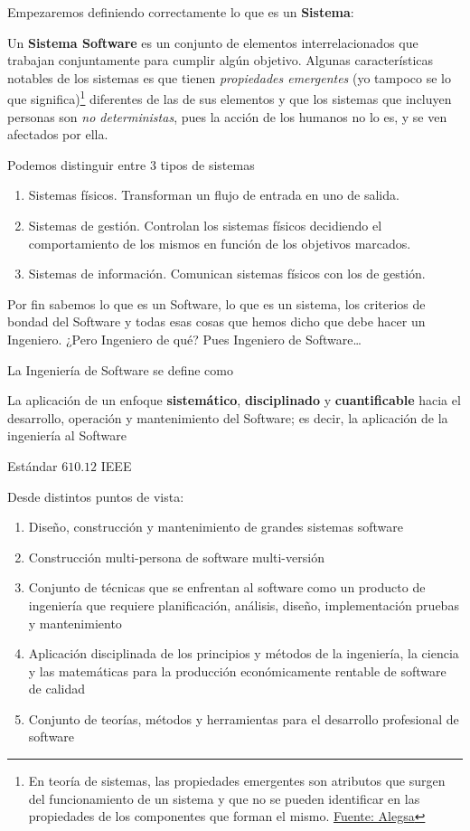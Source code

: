 \noindent Empezaremos definiendo correctamente lo que es un \textbf{Sistema}:

Un \textbf{Sistema Software} es un conjunto de elementos interrelacionados que trabajan conjuntamente para
cumplir algún objetivo. Algunas características notables de los sistemas es que tienen \textit{propiedades
emergentes} (yo tampoco se lo que significa)\footnote{En teoría de sistemas, las propiedades emergentes son 
atributos que surgen del funcionamiento de un sistema y que no se pueden identificar en las propiedades de los
componentes que forman el mismo. \href{https://www.alegsa.com.ar/Dic/propiedad_emergente.php}{Fuente: Alegsa}}
diferentes de las de sus elementos y que los sistemas que incluyen personas son \textit{no deterministas}, pues
la acción de los humanos no lo es, y se ven afectados por ella.

Podemos distinguir entre 3 tipos de sistemas

\begin{enumerate}
    \item Sistemas físicos. Transforman un flujo de entrada en uno de salida.
    \item Sistemas de gestión. Controlan los sistemas físicos decidiendo el comportamiento de los mismos en función
    de los objetivos marcados.
    \item Sistemas de información. Comunican sistemas físicos con los de gestión.
\end{enumerate}

Por fin sabemos lo que es un Software, lo que es un sistema, los criterios de bondad del Software y todas esas
cosas que hemos dicho que debe hacer un Ingeniero. ¿Pero Ingeniero de qué? Pues Ingeniero de Software\dots

La Ingeniería de Software se define como

\begin{enfasis}
    La aplicación de un enfoque \textbf{sistemático}, \textbf{disciplinado} y \textbf{cuantificable} hacia el
    desarrollo, operación y mantenimiento del Software; es decir, la aplicación de la ingeniería al Software

     Estándar $610.12$ IEEE
\end{enfasis}

Desde distintos puntos de vista:
\begin{enumerate}
    \item Diseño, construcción y mantenimiento de grandes sistemas software
    \item Construcción multi-persona de software multi-versión
    \item Conjunto de técnicas que se enfrentan al software como un producto de ingeniería que requiere 
    planificación, análisis, diseño, implementación pruebas y mantenimiento
    \item Aplicación disciplinada de los principios y métodos de la ingeniería, la ciencia y las matemáticas para
    la producción económicamente rentable de software de calidad
    \item Conjunto de teorías, métodos y herramientas para el desarrollo profesional de software
\end{enumerate}

